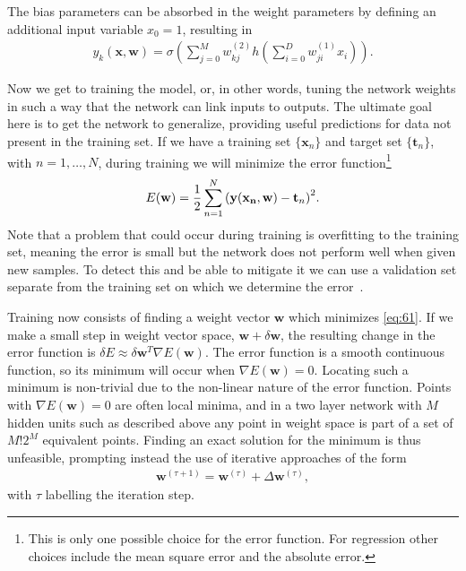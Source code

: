 \documentclass[11pt, a4paper]{report} %
\begin{document}
The bias parameters can be absorbed in the weight parameters by defining an additional input variable \(x_0=1\), resulting in 
\begin{align}
  y_k(\mathbf{x},\mathbf{w}) = \sigma\left(\sum_{j=0}^M w_{kj}^{(2)}h\left(\sum_{i=0}^D w_{ji}^{(1)}x_i\right)\right).
\end{align}

Now we get to training the model, or, in other words, tuning the network weights in such a way that the network can link inputs to outputs.
The ultimate goal here is to get the network to generalize, providing useful predictions for data not present in the training set.
If we have a training set \(\{\mathbf{x}_n\}\) and target set \(\{\mathbf{t}_n\}\), with \(n=1,\ldots,N\), during training we will minimize the error function\footnote{This is only one possible choice for the error function. For regression other choices include the mean square error and the absolute error.}
\begin{align}
  \label{eq:61}
  E(\mathbf{w}) = \frac{1}{2} \sum _{n=1}^N{\qty(\mathbf{y}\qty(\mathbf{x_n}, \mathbf{w})-\mathbf{t}_n)}^2.
\end{align}
Note that a problem that could occur during training is overfitting to the training set, meaning the error is small but the network does not perform well when given new samples.
To detect this and be able to mitigate it we can use a validation set separate from the training set on which we determine the error~\cite{Bishop2006}.

Training now consists of finding a weight vector \(\mathbf{w}\) which minimizes \cref{eq:61}.
If we make a small step in weight vector space, \(\mathbf{w}+\delta\mathbf{w}\), the resulting change in the error function is \(\delta E \approx \delta \mathbf{w}^{T}\nabla E(\mathbf{w})\).
The error function is a smooth continuous function, so its minimum will occur when \(\nabla E(\mathbf{w})=0\).
Locating such a minimum is non-trivial due to the non-linear nature of the error function.
Points with \(\nabla E(\mathbf{w})=0\) are often local minima, and in a two layer network with \(M\) hidden units such as described above any point in weight space is part of a set of \(M!2^M\) equivalent points.
Finding an exact solution for the minimum is thus unfeasible, prompting instead the use of iterative approaches of the form
\begin{align}
  \label{eq:62}
\mathbf{w}^{(\tau+1)}=\mathbf{w}^{(\tau)}+\Delta \mathbf{w}^{(\tau)},
\end{align}
with \(\tau\) labelling the iteration step.
\end{document}
